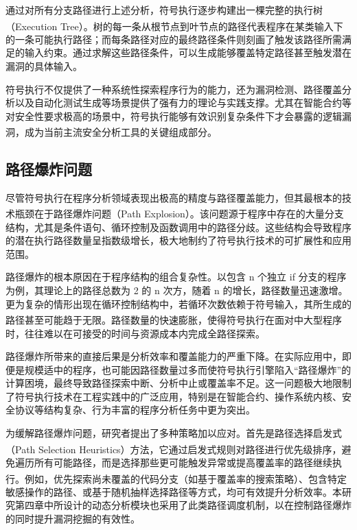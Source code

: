 \documentclass[print, master, vlined, timesmath]{DissertUESTC}
\begin{document}
通过对所有分支路径进行上述分析，符号执行逐步构建出一棵完整的执行树（Execution Tree）\textsuperscript{\cite{...}}。树的每一条从根节点到叶节点的路径代表程序在某类输入下的一条可能执行路径；而每条路径对应的最终路径条件则刻画了触发该路径所需满足的输入约束。通过求解这些路径条件，可以生成能够覆盖特定路径甚至触发潜在漏洞的具体输入。

符号执行不仅提供了一种系统性探索程序行为的能力，还为漏洞检测、路径覆盖分析以及自动化测试生成等场景提供了强有力的理论与实践支撑。尤其在智能合约等对安全性要求极高的场景中，符号执行能够有效识别复杂条件下才会暴露的逻辑漏洞，成为当前主流安全分析工具的关键组成部分\textsuperscript{\cite{...}}。

\subsection{路径爆炸问题}

尽管符号执行在程序分析领域表现出极高的精度与路径覆盖能力，但其最根本的技术瓶颈在于路径爆炸问题（Path Explosion）\textsuperscript{\cite{...}}。该问题源于程序中存在的大量分支结构，尤其是条件语句、循环控制及函数调用中的路径分歧。这些结构会导致程序的潜在执行路径数量呈指数级增长，极大地制约了符号执行技术的可扩展性和应用范围。

路径爆炸的根本原因在于程序结构的组合复杂性。以包含 n 个独立 if 分支的程序为例，其理论上的路径总数为 2 的 n 次方，随着 n 的增长，路径数量迅速激增。更为复杂的情形出现在循环控制结构中，若循环次数依赖于符号输入，其所生成的路径甚至可能趋于无限\textsuperscript{\cite{...}}。路径数量的快速膨胀，使得符号执行在面对中大型程序时，往往难以在可接受的时间与资源成本内完成全路径探索。

路径爆炸所带来的直接后果是分析效率和覆盖能力的严重下降。在实际应用中，即便是规模适中的程序，也可能因路径数量过多而使符号执行引擎陷入“路径爆炸”的计算困境，最终导致路径探索中断、分析中止或覆盖率不足。这一问题极大地限制了符号执行技术在工程实践中的广泛应用，特别是在智能合约、操作系统内核、安全协议等结构复杂、行为丰富的程序分析任务中更为突出。

为缓解路径爆炸问题，研究者提出了多种策略加以应对。首先是路径选择启发式（Path Selection Heuristics）方法\textsuperscript{\cite{...}}，它通过启发式规则对路径进行优先级排序，避免遍历所有可能路径，而是选择那些更可能触发异常或提高覆盖率的路径继续执行。例如，优先探索尚未覆盖的代码分支（如基于覆盖率的搜索策略\textsuperscript{\cite{...}}）、包含特定敏感操作的路径、或基于随机抽样选择路径等方式，均可有效提升分析效率。本研究第四章中所设计的动态分析模块也采用了此类路径调度机制，以在控制路径爆炸的同时提升漏洞挖掘的有效性。
\end{document}
